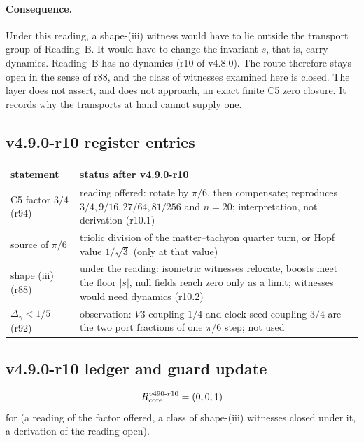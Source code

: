 \paragraph{Consequence.}
Under this reading, a shape-(iii) witness would have to lie outside the transport group of Reading~B.  It would have to
change the invariant \(s\), that is, carry dynamics.  Reading~B has no dynamics (r10 of v4.8.0).  The route therefore stays
open in the sense of r88, and the class of witnesses examined here is closed.  The layer does not assert, and does not
approach, an exact finite C5 zero closure.  It records why the transports at hand cannot supply one.

\subsection*{v4.9.0-r10 register entries}
\label{subsec:v490-r10-register}

\begin{center}
\small
\begin{tabular}{@{}>{\raggedright\arraybackslash}p{}>{\raggedright\arraybackslash}p{}@{}}
\toprule
statement & status after v4.9.0-r10\\
\midrule
C5 factor \(3/4\) (r94) & reading offered: rotate by \(\pi/6\), then compensate; reproduces \(3/4,9/16,27/64,81/256\) and \(n=20\); interpretation, not derivation (r10.1)\\
source of \(\pi/6\) & triolic division of the matter--tachyon quarter turn, or Hopf value \(1/\sqrt3\) (only at that value)\\
shape (iii) (r88) & under the reading: isometric witnesses relocate, boosts meet the floor \(|s|\), null fields reach zero only as a limit; witnesses would need dynamics (r10.2)\\
\(\Delta_\gamma<1/5\) (r92) & observation: \(V3\) coupling \(1/4\) and clock-seed coupling \(3/4\) are the two port fractions of one \(\pi/6\) step; not used\\
\bottomrule
\end{tabular}
\end{center}

\subsection*{v4.9.0-r10 ledger and guard update}
\label{subsec:v490-r10-ledger-guard}

\[
R_{\rm core}^{v490\text{-}r10}=(0,0,1)
\]
for (a reading of the factor offered, a class of shape-(iii) witnesses closed under it, a derivation of the reading open).

